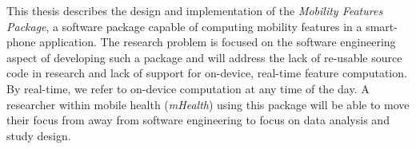 This thesis describes the design and implementation of the \textit{Mobility Features Package}, a software package capable of computing mobility features in a smart-phone application. The research problem is focused on the software engineering aspect of developing such a package and will address the lack of re-usable source code in research and lack of support for on-device, real-time feature computation. By real-time, we refer to on-device computation at any time of the day. A researcher within mobile health (\textit{mHealth}) using this package will be able to move their focus from away from software engineering to focus on data analysis and study design.